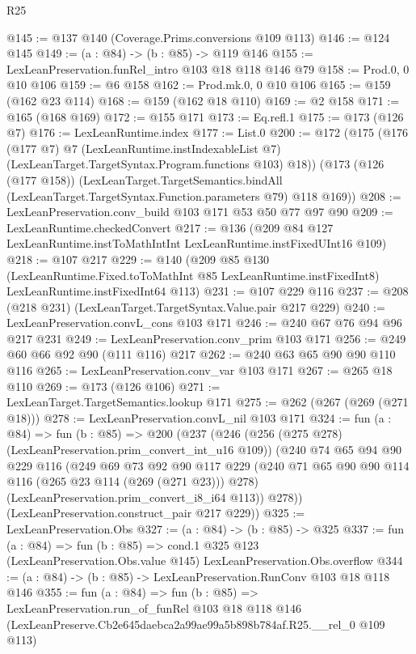 \begin{lexlean}{R25}
\begin{coremodule}
@145 := @137 @140 (Coverage.Prims.conversions @109 @113)
@146 := @124 @145
@149 := (a : @84) -> (b : @85) -> @119 @146
@155 := LexLeanPreservation.funRel_intro @103 @18 @118 @146 @79
@158 := Prod.{0, 0} @10 @106
@159 := @6 @158
@162 := Prod.mk.{0, 0} @10 @106
@165 := @159 (@162 @23 @114)
@168 := @159 (@162 @18 @110)
@169 := @2 @158
@171 := @165 (@168 @169)
@172 := @155 @171
@173 := Eq.refl.{1}
@175 := @173 (@126 @7)
@176 := LexLeanRuntime.index
@177 := List.{0}
@200 := @172
    (@175
      (@176
        (@177 @7)
        @7
        (LexLeanRuntime.instIndexableList @7)
        (LexLeanTarget.TargetSyntax.Program.functions @103)
        @18))
    (@173
      (@126 (@177 @158))
      (LexLeanTarget.TargetSemantics.bindAll
        (LexLeanTarget.TargetSyntax.Function.parameters @79)
        @118
        @169))
@208 := LexLeanPreservation.conv_build @103 @171 @53 @50 @77 @97 @90
@209 := LexLeanRuntime.checkedConvert
@217 := @136 (@209 @84 @127 LexLeanRuntime.instToMathIntInt LexLeanRuntime.instFixedUInt16 @109)
@218 := @107 @217
@229 := @140
    (@209
      @85
      @130
      (LexLeanRuntime.Fixed.toToMathInt @85 LexLeanRuntime.instFixedInt8)
      LexLeanRuntime.instFixedInt64
      @113)
@231 := @107 @229 @116
@237 := @208 (@218 @231) (LexLeanTarget.TargetSyntax.Value.pair @217 @229)
@240 := LexLeanPreservation.convL_cons @103 @171
@246 := @240 @67 @76 @94 @96 @217 @231
@249 := LexLeanPreservation.conv_prim @103 @171
@256 := @249 @60 @66 @92 @90 (@111 @116) @217
@262 := @240 @63 @65 @90 @90 @110 @116
@265 := LexLeanPreservation.conv_var @103 @171
@267 := @265 @18 @110
@269 := @173 (@126 @106)
@271 := LexLeanTarget.TargetSemantics.lookup @171
@275 := @262 (@267 (@269 (@271 @18)))
@278 := LexLeanPreservation.convL_nil @103 @171
@324 := fun (a : @84) =>
  fun (b : @85) =>
  @200
    (@237
      (@246
        (@256 (@275 @278) (LexLeanPreservation.prim_convert_int_u16 @109))
        (@240
          @74
          @65
          @94
          @90
          @229
          @116
          (@249
            @69
            @73
            @92
            @90
            @117
            @229
            (@240 @71 @65 @90 @90 @114 @116 (@265 @23 @114 (@269 (@271 @23))) @278)
            (LexLeanPreservation.prim_convert_i8_i64 @113))
          @278))
      (LexLeanPreservation.construct_pair @217 @229))
@325 := LexLeanPreservation.Obs
@327 := (a : @84) -> (b : @85) -> @325
@337 := fun (a : @84) =>
  fun (b : @85) =>
  cond.{1} @325 @123 (LexLeanPreservation.Obs.value @145) LexLeanPreservation.Obs.overflow
@344 := (a : @84) -> (b : @85) -> LexLeanPreservation.RunConv @103 @18 @118 @146
@355 := fun (a : @84) =>
  fun (b : @85) =>
  LexLeanPreservation.run_of_funRel
    @103
    @18
    @118
    @146
    (LexLeanPreserve.Cb2e645daebca2a99ae99a5b898b784af.R25.__rel_0 @109 @113)
\end{coremodule}
\end{lexlean}
